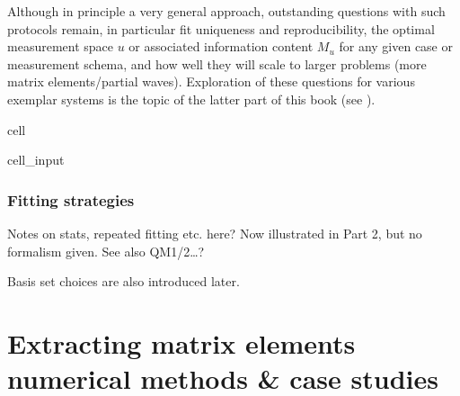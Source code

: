 \documentclass[letterpaper,table,10pt,english]{jupyterBook}
\begin{document}
\sphinxAtStartPar
Although in principle a very general approach, outstanding questions with such protocols remain, in particular fit uniqueness and reproducibility, the optimal measurement space \(u\) \sphinxhyphen{} or associated information content \(M_u\) \sphinxhyphen{} for any given case or measurement schema, and how well they will scale to larger problems (more matrix elements/partial waves). Exploration of these questions for various exemplar systems is the topic of the latter part of this book (see ).

\begin{sphinxuseclass}{cell}\begin{sphinxVerbatimInput}

\begin{sphinxuseclass}{cell_input}
\begin{sphinxVerbatim}[commandchars=\\\{\}]
\end{sphinxVerbatim}

\end{sphinxuseclass}\end{sphinxVerbatimInput}

\end{sphinxuseclass}

\section{Fitting strategies}
\label{\detokenize{part1/numerics_231122:fitting-strategies}}
\sphinxAtStartPar
Notes on stats, repeated fitting etc. here? Now illustrated in Part 2, but no formalism given. See also QM1/2…?

\sphinxAtStartPar
Basis set choices are also introduced later.

\sphinxstepscope


\part{Extracting matrix elements \sphinxhyphen{} numerical methods \& case studies}

\sphinxstepscope
\end{document}
